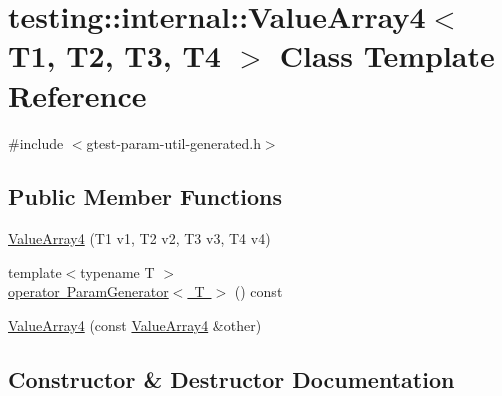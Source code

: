 \hypertarget{classtesting_1_1internal_1_1ValueArray4}{}\section{testing\+::internal\+::Value\+Array4$<$ T1, T2, T3, T4 $>$ Class Template Reference}
\label{classtesting_1_1internal_1_1ValueArray4}


{\ttfamily \#include $<$gtest-\/param-\/util-\/generated.\+h$>$}

\subsection*{Public Member Functions}
\begin{DoxyCompactItemize}
\item 
\mbox{\hyperlink{classtesting_1_1internal_1_1ValueArray4_a5288bbb1a3149842ab13d689cf1fd48f}{Value\+Array4}} (T1 v1, T2 v2, T3 v3, T4 v4)
\item 
{\footnotesize template$<$typename T $>$ }\\\mbox{\hyperlink{classtesting_1_1internal_1_1ValueArray4_aef21f582b20423f5fb8515d9879ad557}{operator Param\+Generator$<$ T $>$}} () const
\item 
\mbox{\hyperlink{classtesting_1_1internal_1_1ValueArray4_a3703e95dc214c47d705cf68fdf2e262b}{Value\+Array4}} (const \mbox{\hyperlink{classtesting_1_1internal_1_1ValueArray4}{Value\+Array4}} \&other)
\end{DoxyCompactItemize}


\subsection{Constructor \& Destructor Documentation}
\mbox{\label{classtesting_1_1internal_1_1ValueArray4_a5288bbb1a3149842ab13d689cf1fd48f}} 
